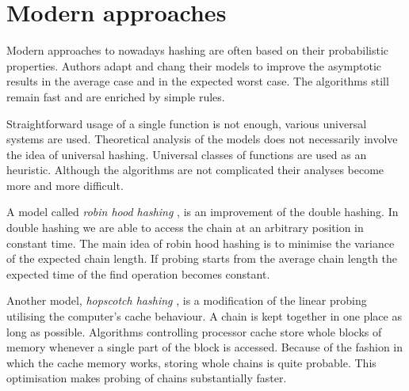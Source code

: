 \section{Modern approaches}
Modern approaches to nowadays hashing are often based on their probabilistic properties. Authors adapt and chang their models to improve the asymptotic results in the average case and in the expected worst case. The algorithms still remain fast and are enriched by simple rules. 

Straightforward usage of a single function is not enough, various universal systems are used. Theoretical analysis of the models does not necessarily involve the idea of universal hashing. Universal classes of functions are used as an heuristic. Although the algorithms are not complicated their analyses become more and more difficult.

A model called \emph{robin hood hashing} \cite{10.1109/SFCS.1985.48}, \cite{Devroye04onworst} is an improvement of the double hashing. In double hashing we are able to access the chain at an arbitrary position in constant time. The main idea of robin hood hashing is to minimise the variance of the expected chain length. If probing starts from the average chain length the expected time of the find operation becomes constant.

Another model, \emph{hopscotch hashing} \cite{DBLP:conf/wdag/HerlihyST08}, is a modification of the linear probing utilising the computer's cache behaviour. A chain is kept together in one place as long as possible. Algorithms controlling processor cache store whole blocks of memory whenever a single part of the block is accessed. Because of the fashion in which the cache memory works, storing whole chains is quite probable. This optimisation makes probing of chains substantially faster.
